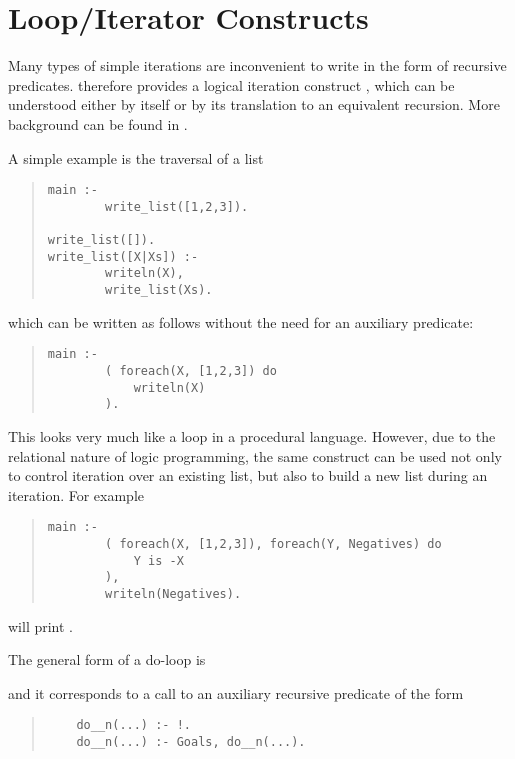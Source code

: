 \section{Loop/Iterator Constructs}
\label{doloops}
Many types of simple iterations are inconvenient to write in the
form of recursive predicates. {\eclipse} therefore provides a logical
iteration construct
,
which can be understood either by itself
or by its translation to an equivalent recursion.
More background can be found in \cite{loops02}.

A simple example is the traversal of a list
\begin{quote}
\begin{verbatim}
main :-
        write_list([1,2,3]).

write_list([]).
write_list([X|Xs]) :-
        writeln(X),
        write_list(Xs).
\end{verbatim}
\end{quote}
which can be written as follows without the need for an auxiliary predicate:
\begin{quote}
\begin{verbatim}
main :-
        ( foreach(X, [1,2,3]) do
            writeln(X)
        ).
\end{verbatim}
\end{quote}
This looks very much like a loop in a procedural language. However,
due to the relational nature of logic programming, the same 
construct can be used not only to control iteration over an existing list,
but also to build a new list during an iteration. For example
\begin{quote}
\begin{verbatim}
main :-
        ( foreach(X, [1,2,3]), foreach(Y, Negatives) do
            Y is -X
        ),
        writeln(Negatives).
\end{verbatim}
\end{quote}
will print \notation{[-1, -2, -3]}.

The general form of a do-loop is
\begin{quote}
\end{quote}
and it corresponds to a call to an auxiliary recursive
predicate of the form
\begin{quote}
\begin{verbatim}
    do__n(...) :- !.
    do__n(...) :- Goals, do__n(...).
\end{verbatim}
\end{quote}

